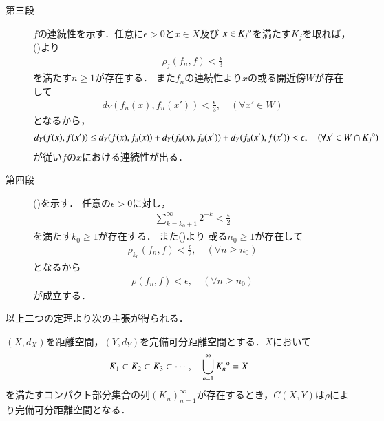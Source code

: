 \begin{prf}
\begin{description}
			\item[第三段]
				$f$の連続性を示す．任意に$\epsilon > 0$と$x \in X$及び
				$x \in {\kern0ptK_j}^{\mathrm{o}}$を満たす$K_j$を取れば，
				()より
				\begin{align}
					\rho_j(f_n,f) < \frac{\epsilon}{3}
				\end{align}
				を満たす$n \geq 1$が存在する．
				また$f_n$の連続性より$x$の或る開近傍$W$が存在して
				\begin{align}
					d_Y(f_n(x),f_n(x')) < \frac{\epsilon}{3},
					\quad (\forall x' \in W)
				\end{align}
				となるから，
				\begin{align}
					d_Y(f(x),f(x'))
					\leq d_Y(f(x),f_n(x)) + d_Y(f_n(x),f_n(x')) + d_Y(f_n(x'),f(x'))
					< \epsilon,
					\quad (\forall x' \in W \cap {\kern0ptK_j}^{\mathrm{o}})
				\end{align}
				が従い$f$の$x$における連続性が出る．
			
			\item[第四段]
				()を示す．
				任意の$\epsilon > 0$に対し，
				\begin{align}
					\sum_{k=k_0+1}^\infty 2^{-k} < \frac{\epsilon}{2}
				\end{align}
				を満たす$k_0 \geq 1$が存在する．
				また()より
				或る$n_0 \geq 1$が存在して
				\begin{align}
					\rho_{k_0}(f_n,f) < \frac{\epsilon}{2},
					\quad (\forall n \geq n_0)
				\end{align}
				となるから
				\begin{align}
					\rho(f_n,f) < \epsilon, \quad (\forall n \geq n_0)
				\end{align}
				が成立する．
				\QED
		\end{description}
	\end{prf}
	
	以上二つの定理より次の主張が得られる．
	\begin{screen}
		\begin{thm}[$C(X,Y)$の完備可分性]\label{thm:appendix_complete_separability_of_spaces_of_continuous_functions}
			$(X,d_X)$を距離空間，$(Y,d_Y)$を完備可分距離空間とする．$X$において
			\begin{align}
				K_1 \subset K_2 \subset K_3 \subset \cdots,
				\quad \bigcup_{n=1}^\infty {\kern0ptK_n}^{\mathrm{o}} = X
			\end{align}
			を満たすコンパクト部分集合の列$(K_n)_{n=1}^\infty$が存在するとき，$C(X,Y)$は$\rho$により完備可分距離空間となる．
		\end{thm}
	\end{screen}